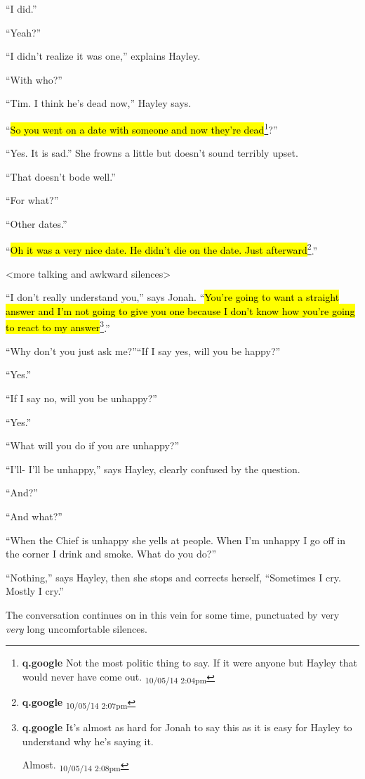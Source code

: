 ``I did.''

``Yeah?''

``I didn't realize it was one,'' explains Hayley.

``With who?''

``Tim.  I think he's dead now,'' Hayley says.  

``\hl{So you went on a date with someone and now they're dead}\footnote{\textbf{q.google }Not the most politic thing to say.  If it were anyone but Hayley that would never have come out. \textsubscript{10/05/14 2:04pm}}?''

``Yes. It is sad.''  She frowns a little but doesn't sound terribly upset.

``That doesn't bode well.''

``For what?''

``Other dates.''

``\hl{Oh it was a very nice date.  He didn't die on the date.  Just afterward}\footnote{\textbf{q.google } \textsubscript{10/05/14 2:07pm}}.''

\textless more talking and awkward silences\textgreater 

``I don't really understand you,'' says Jonah.  ``\hl{You're going to want a straight answer and I'm not going to give you one because I don't know how you're going to react to my answer}\footnote{\textbf{q.google }It's almost as hard for Jonah to say this as it is easy for Hayley to understand why he's saying it.

Almost. \textsubscript{10/05/14 2:08pm}}.''

``Why don't you just ask me?''``If I say yes, will you be happy?''

``Yes.''

``If I say no, will you be unhappy?''

``Yes.''

``What will you do if you are unhappy?''

``I'll- I'll be unhappy,'' says Hayley, clearly confused by the question.

``And?''

``And what?''

``When the Chief is unhappy she yells at people.  When I'm unhappy I go off in the corner I drink and smoke. What do you do?''

``Nothing,'' says Hayley, then she stops and corrects herself, ``Sometimes I cry.  Mostly I cry.''

The conversation continues on in this vein for some time, punctuated by very \textit{very }long uncomfortable silences.   

